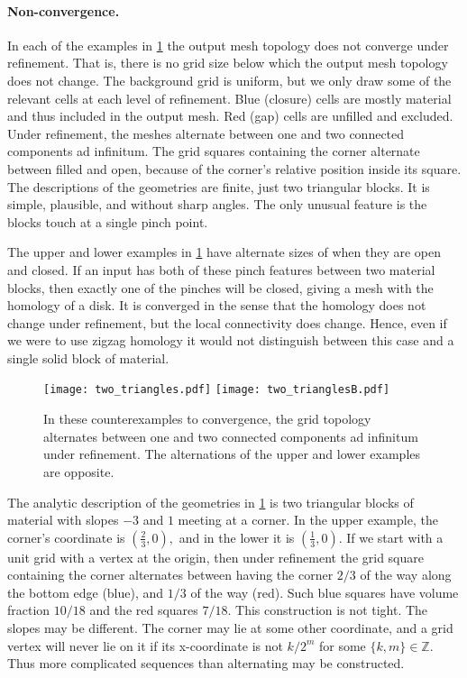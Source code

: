 \paragraph{Non-convergence.}
In each of the examples in \cref{fig:two_triangles} the output mesh topology does not converge under refinement. That is, there is no grid size below which the output mesh topology does not change.
The background grid is uniform, but we only draw some of the relevant cells at each level of refinement. Blue (closure) cells are mostly material and thus included in the output mesh. Red (gap) cells are unfilled and excluded.
Under refinement, the meshes alternate between one and two connected components ad infinitum.
The grid squares containing the corner alternate between filled and open, because of the corner’s relative position inside its square.
The descriptions of the geometries are finite, just two triangular blocks. It is simple, plausible, and without sharp angles. The only unusual feature is the blocks touch at a single pinch point.


The upper and lower examples in \cref{fig:two_triangles} have alternate sizes of when they are open and closed. If an input has both of these pinch features between two material blocks, then exactly one of the pinches will be closed, giving a mesh with the homology of a disk. It is converged in the sense that the homology does not change under refinement, but the local connectivity does change. Hence, even if we were to use zigzag homology it would not distinguish between this case and a single solid block of material.

\begin{figure}[!htb]
\centering
\texttt{[image: two\_triangles.pdf]}
\texttt{[image: two\_trianglesB.pdf]}
\caption{In these counterexamples to convergence, the grid topology alternates between one and two connected components ad infinitum under refinement. The alternations of the upper and lower examples are opposite.}\label{fig:two_triangles}
\end{figure}
 
The analytic description of the geometries in \cref{fig:two_triangles} is two triangular blocks of material with slopes $-3$ and $1$ meeting at a corner. In the upper example, the corner's coordinate is $(\frac{2}{3},0),$ and in the lower it is  $(\frac{1}{3},0).$ 
If we start with a unit grid with a vertex at the origin, then under refinement the grid square containing the corner alternates between having the corner $2/3$ of the way along the bottom edge (blue), and $1/3$ of the way (red). Such blue squares have volume fraction $10/18$ and the red squares $7/18.$ This construction is not tight. The slopes may be different. The corner may lie at some other coordinate, and a grid vertex will never lie on it if its x-coordinate is not $k/2^m$ for some $\{k,m\} \in \mathbb{Z}.$ Thus more complicated sequences than alternating may be constructed.
